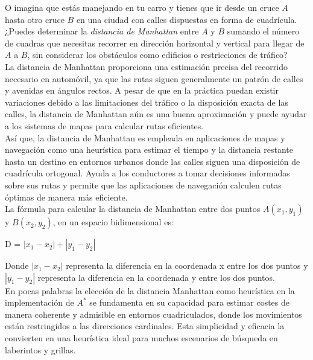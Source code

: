 O imagina que estás manejando en tu carro y tienes que ir desde un cruce $A$ hasta otro cruce $B$ 
en una ciudad con calles dispuestas en forma de cuadrícula. ¿Puedes determinar la 
\textit{distancia de Manhattan} entre $A$ y $B$ sumando el número de cuadras que necesitas recorrer 
en dirección horizontal y vertical para llegar de $A$ a $B$, sin considerar los obstáculos como 
edificios o restricciones de tráfico?\\ 


La distancia de Manhattan proporciona una estimación precisa del recorrido necesario en automóvil,
ya que las rutas siguen generalmente un patrón de calles y avenidas en ángulos rectos. A pesar de
que en la práctica puedan existir variaciones debido a las limitaciones del tráfico o la disposición
exacta de las calles, la distancia de Manhattan aún es una buena aproximación y puede ayudar a los 
sistemas de mapas para calcular rutas eficientes. \\ 

Así que, la distancia de Manhattan es empleada en aplicaciones de mapas y navegación como una 
heurística para estimar el tiempo y la distancia restante hasta un destino en entornos urbanos 
donde las calles siguen una disposición de cuadrícula ortogonal. Ayuda a los conductores a tomar 
decisiones informadas sobre sus rutas y permite que las aplicaciones de navegación calculen rutas 
óptimas de manera más eficiente.\\ 


La fórmula para calcular la distancia de Manhattan entre dos puntos $A(x_1, y_1)$ y $B(x_2,y_2)$,
en un espacio bidimensional es:
\begin{center}
    D = $|x_1 - x_2| + |y_1 - y_2|$
\end{center}

Donde $|x_1 - x_2|$ representa la diferencia en la coordenada x entre los dos puntos y  
$|y_1 - y_2|$ representa la diferencia en la coordenada y entre los dos puntos.\\ 


En pocas palabras la elección de la distancia Manhattan como heurística en la implementación de 
$A^{*}$ se fundamenta en su capacidad para estimar costes de manera coherente y admisible en entornos 
cuadriculados, donde los movimientos están restringidos a las direcciones cardinales. 
Esta simplicidad y eficacia la convierten en una heurística ideal para muchos escenarios de búsqueda 
en laberintos y grillas.

